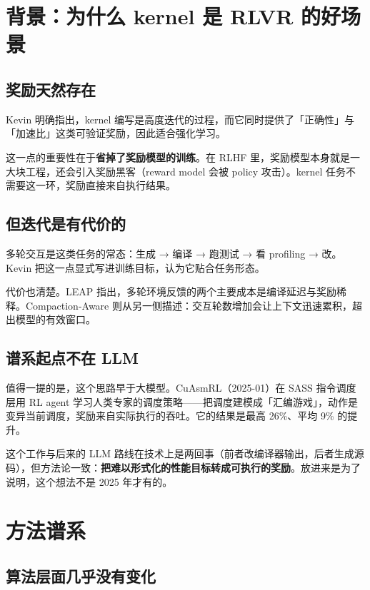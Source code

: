 \section{背景：为什么 kernel 是 RLVR 的好场景}

\subsection{奖励天然存在}

Kevin 明确指出，kernel 编写是高度迭代的过程，而它同时提供了「正确性」与「加速比」这类可验证奖励，因此适合强化学习。

这一点的重要性在于\textbf{省掉了奖励模型的训练}。在 RLHF 里，奖励模型本身就是一大块工程，还会引入奖励黑客（reward model 会被 policy 攻击）。kernel 任务不需要这一环，奖励直接来自执行结果。

\subsection{但迭代是有代价的}

多轮交互是这类任务的常态：生成 → 编译 → 跑测试 → 看 profiling → 改。Kevin 把这一点显式写进训练目标，认为它贴合任务形态。

代价也清楚。LEAP 指出，多轮环境反馈的两个主要成本是编译延迟与奖励稀释。Compaction-Aware 则从另一侧描述：交互轮数增加会让上下文迅速累积，超出模型的有效窗口。

\subsection{谱系起点不在 LLM}

值得一提的是，这个思路早于大模型。CuAsmRL（2025-01）在 SASS 指令调度层用 RL agent 学习人类专家的调度策略——把调度建模成「汇编游戏」，动作是变异当前调度，奖励来自实际执行的吞吐。它的结果是最高 26\%、平均 9\% 的提升。

这个工作与后来的 LLM 路线在技术上是两回事（前者改编译器输出，后者生成源码），但方法论一致：\textbf{把难以形式化的性能目标转成可执行的奖励}。放进来是为了说明，这个想法不是 2025 年才有的。

\section{方法谱系}

\subsection{算法层面几乎没有变化}


